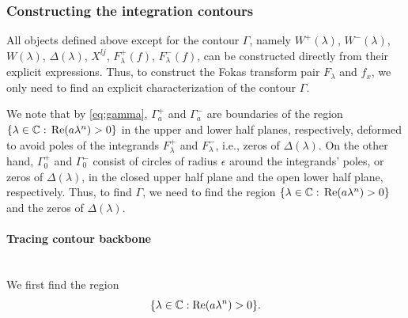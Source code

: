 \documentclass[12pt, oneside, a4paper]{article}
\begin{document}

\subsubsection{Constructing the integration contours}\label{sec:constructing_contours}
All objects defined above except for the contour $\Gamma$, namely $W^+(\lambda)$, $W^-(\lambda)$, $W(\lambda)$, $\Delta(\lambda)$, $X^{lj}$, $F^+_\lambda(f)$, $F^-_\lambda(f)$, can be constructed directly from their explicit expressions. Thus, to construct the Fokas transform pair $F_\lambda$ and $f_x$, we only need to find an explicit characterization of the contour $\Gamma$.


We note that by \eqref{eq:gamma}, $\Gamma_a^+$ and $\Gamma_a^-$ are boundaries of the region $\{\lambda\in\mathbb C:\, \mathrm{Re}(a\lambda^n)>0\}$ in the upper and lower half planes, respectively, deformed to avoid poles of the integrands $F^+_\lambda$ and $F^-_\lambda$, i.e., zeros of $\Delta(\lambda)$. On the other hand, $\Gamma_0^+$ and $\Gamma_0^-$ consist of circles of radius $\epsilon$ around the integrands' poles, or zeros of $\Delta(\lambda)$, in the closed upper half plane and the open lower half plane, respectively. Thus, to find $\Gamma$, we need to find the region $\{\lambda\in\mathbb C:\, \mathrm{Re}(a\lambda^n)>0\}$ and the zeros of $\Delta(\lambda)$.

\paragraph{Tracing contour backbone}\mbox{}\label{par:tracing_contour_sectors}\\
We first find the region
\[\{\lambda\in\mathbb C: \mathrm{Re}(a\lambda^n)>0\}.\]
\end{document}
